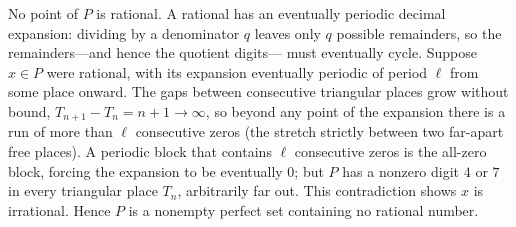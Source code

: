 \documentclass[main.tex]{subfiles}
\begin{document}
\begin{SolutionBlue}
No point of $P$ is rational. A rational has an eventually periodic decimal expansion: dividing by a
denominator $q$ leaves only $q$ possible remainders, so the remainders---and hence the quotient digits---
must eventually cycle. Suppose $x\in P$ were rational, with its expansion eventually periodic of period
$\ell$ from some place onward. The gaps between consecutive triangular places grow without bound,
$T_{n+1}-T_n=n+1\to\infty$, so beyond any point of the expansion there is a run of more than $\ell$
consecutive zeros (the stretch strictly between two far-apart free places). A periodic block that contains
$\ell$ consecutive zeros is the all-zero block, forcing the expansion to be eventually $0$; but $P$ has a
nonzero digit $4$ or $7$ in every triangular place $T_n$, arbitrarily far out. This contradiction shows
$x$ is irrational. Hence $P$ is a nonempty perfect set containing no rational number.
\end{SolutionBlue}
\end{document}
